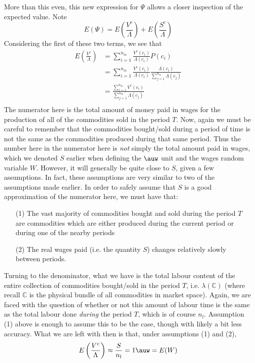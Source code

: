More than this even, this new expression for $\Psi$ allows a closer inspection of the expected value. Note
\[ E(\Psi) = E\left(\frac{V^c}{\Lambda}\right)+E\left(\frac{S^c}{\Lambda}\right) \]
Considering the first of these two terms, we see that
\begin{align}
	E\left(\frac{V^c}{\Lambda}\right) &= \sum_{i=1}^{n_m} \frac{V^c(c_i)}{\Lambda(c_i)}P(c_i) \\
		&= \sum_{i=1}^{n_m} \frac{V^c(c_i)}{\Lambda(c_i)}\frac{\Lambda(c_i)}{\sum_{j=1}^{n_m}\Lambda(c_j)} \\
		&= \frac{\sum_{i=1}^{n_m}V^c(c_i)}{\sum_{j=1}^{n_m}\Lambda(c_j)} \\
\end{align}
The numerator here is the total amount of money paid in wages for the production of all of the commodities sold in the period $T$. Now, again we must be careful to remember that the commodities bought/sold during a period of time is not the same as the commodities produced during that same period. Thus the number here in the numerator here is \textit{not} simply the total amount paid in wages, which we denoted $S$ earlier when defining the $\auw$ unit and the wages random variable $W$. However, it will generally be quite close to $S$, given a few assumptions. In fact, these assumptions are very similar to two of the assumptions  made earlier. In order to safely assume that $S$ is a good approximation of the numerator here, we must have that:
\begin{itemize}
	\item[(1)] The vast majority of commodities bought and sold during the period $T$ are commodities which are either produced during the current period or during one of the nearby periods
	\item[(2)] The real wages paid (i.e. the quantity $S$) changes relatively slowly between periods. 
\end{itemize}
Turning to the denominator, what we have is the total labour content of the entire collection of commodities bought/sold in the period $T$, i.e. $\lambda(\mathbb{C})$ (where recall $\mathbb{C}$ is the physical bundle of all commodities in market space). Again, we are faced with the question of whether or not this amount of labour time is the same as the total labour done \textit{during} the period $T$, which is of course $n_l$. Assumption (1) above is enough to assume this to be the case, though with likely a bit less accuracy. What we are left with then is that, under assumptions (1) and (2), 
\[ E\left(\frac{V^c}{\Lambda}\right) \approx \frac{S}{n_l} = 1\auw = E(W) \]
